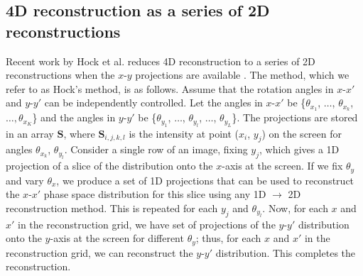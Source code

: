 \subsection{4D reconstruction as a series of 2D reconstructions}

Recent work by Hock et al. reduces 4D reconstruction to a series of 2D reconstructions when the $x$-$y$ projections are available \cite{Hock2013a}. The method, which we refer to as Hock's method, is as follows. Assume that the rotation angles in $x$-$x'$ and $y$-$y'$ can be independently controlled. Let the angles in $x$-$x'$ be \{$\theta_{x_1}$, $\dots$, $\theta_{x_k}$, $\dots, \theta_{x_K}$\} and the angles in $y$-$y'$ be \{$\theta_{y_1}$, $\dots$, $\theta_{y_l}$, $\dots$, $\theta_{y_L}$\}. The projections are stored in an array $\mathbf{S}$, where $\mathbf{S}_{i,j,k,l}$ is the intensity at point ($x_i$, $y_j$) on the screen for angles $\theta_{x_k}$, $\theta_{y_l}$. Consider a single row of an image, fixing $y_j$, which gives a 1D projection of a slice of the distribution onto the $x$-axis at the screen. If we fix $\theta_{y}$ and vary $\theta_{x}$, we produce a set of 1D projections that can be used to reconstruct the $x$-$x'$ phase space distribution for this slice using any 1D $\rightarrow$ 2D reconstruction method. This is repeated for each $y_j$ and $\theta_{y_l}$. Now, for each $x$ and $x'$ in the reconstruction grid, we have set of projections of the $y$-$y'$ distribution onto the $y$-axis at the screen for different $\theta_{y}$; thus, for each $x$ and $x'$ in the reconstruction grid, we can reconstruct the $y$-$y'$ distribution. This completes the reconstruction.

